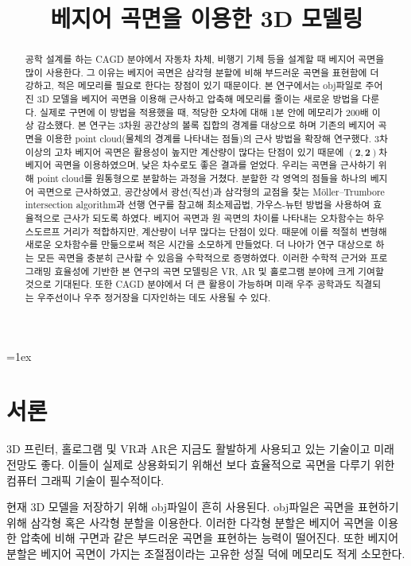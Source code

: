 \documentclass{Humantech_Paper_Awardfullpaper_hutech}
\title{베지어 곡면을 이용한 3D 모델링}
\begin{document}
\font=1ex
\thispagestyle{firstpage}
	
\begin{strip}
	\maketitle
	\begin{abstract} \raggedright
		공학 설계를 하는 CAGD 분야에서 자동차 차체, 비행기 기체 등을 설계할 때 베지어 곡면을 많이 사용한다. 그 이유는 베지어 곡면은 삼각형 분할에 비해 부드러운 곡면을 표현함에 더 강하고, 적은 메모리를 필요로 한다는 장점이 있기 때문이다. 본 연구에서는 obj파일로 주어진 3D 모델을 베지어 곡면을 이용해 근사하고 압축해 메모리를 줄이는 새로운 방법을 다룬다. 실제로 구면에 이 방법을 적용했을 때, 적당한 오차에 대해 1분 안에 메모리가 200배 이상 감소했다. 본 연구는 3차원 공간상의 볼록 집합의 경계를 대상으로 하며 기존의 베지어 곡면을 이용한 point cloud(물체의 경계를 나타내는 점들)의 근사 방법을 확장해 연구했다. 3차 이상의 고차 베지어 곡면은 활용성이 높지만 계산량이 많다는 단점이 있기 때문에 $\bm{(2, 2)}$차 베지어 곡면을 이용하였으며, 낮은 차수로도 좋은 결과를 얻었다. 우리는 곡면을 근사하기 위해 point cloud를 원통형으로 분할하는 과정을 거쳤다. 분할한 각 영역의 점들을 하나의 베지어 곡면으로 근사하였고, 공간상에서 광선(직선)과 삼각형의 교점을 찾는 Möller–Trumbore intersection algorithm과 선행 연구를 참고해 최소제곱법, 가우스-뉴턴 방법을 사용하여 효율적으로 근사가 되도록 하였다. 베지어 곡면과 원 곡면의 차이를 나타내는 오차함수는 하우스도르프 거리가 적합하지만, 계산량이 너무 많다는 단점이 있다. 때문에 이를 적절히 변형해 새로운 오차함수를 만듦으로써 적은 시간을 소모하게 만들었다. 더 나아가 연구 대상으로 하는 모든 곡면을 충분히 근사할 수 있음을 수학적으로 증명하였다. 이러한 수학적 근거와 프로그래밍 효율성에 기반한 본 연구의 곡면 모델링은 VR, AR 및 홀로그램 분야에 크게 기여할 것으로 기대된다. 또한 CAGD 분야에서 더 큰 활용이 가능하며 미래 우주 공학과도 직결되는 우주선이나 우주 정거장을 디자인하는 데도 사용될 수 있다.
	\end{abstract}
\end{strip}
	
\section{서론}
3D 프린터, 홀로그램 및 VR과 AR은 지금도 활발하게 사용되고 있는 기술이고 미래 전망도 좋다. 이들이 실제로 상용화되기 위해선 보다 효율적으로 곡면을 다루기 위한 컴퓨터 그래픽 기술이 필수적이다. 

현재 3D 모델을 저장하기 위해 obj파일이 흔히 사용된다. obj파일은 곡면을 표현하기 위해 삼각형 혹은 사각형 분할을 이용한다. 이러한 다각형 분할은 베지어 곡면을 이용한 압축에 비해 구면과 같은 부드러운 곡면을 표현하는 능력이 떨어진다. 또한 베지어 분할은 베지어 곡면이 가지는 조절점이라는 고유한 성질 덕에 메모리도 적게 소모한다. 
\end{document}
